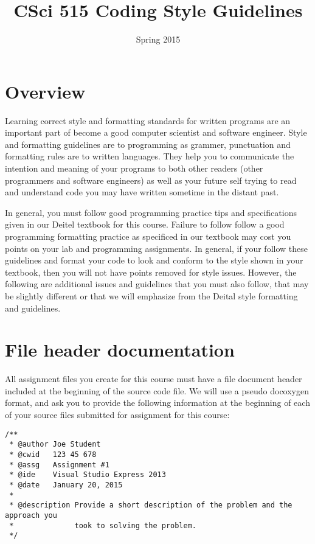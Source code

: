 \documentclass[11pt]{article}
\title{CSci 515 Coding Style Guidelines}
\author{}
\date{Spring 2015}
\begin{document}
\maketitle


\section*{Overview}
\label{sec-1}


Learning correct style and formatting standards for written programs
are an important part of become a good computer scientist and software
engineer.  Style and formatting guidelines are to programming as
grammer, punctuation and formatting rules are to written languages.
They help you to communicate the intention and meaning of your
programs to both other readers (other programmers and software
engineers) as well as your future self trying to read and understand
code you may have written sometime in the distant past.

In general, you must follow good programming practice tips and
specifications given in our Deitel textbook for this course.  Failure
to follow follow a good programming formatting practice as specificed
in our textbook may cost you points on your lab and programming
assignments.  In general, if your follow these guidelines and format
your code to look and conform to the style shown in your textbook,
then you will not have points removed for style issues.  However, the
following are additional issues and guidelines that you must also
follow, that may be slightly different or that we will emphasize from
the Deital style formatting and guidelines.
\section*{File header documentation}
\label{sec-2}


All assignment files you create for this course must have a file
document header included at the beginning of the source code file.  We
will use a pseudo docoxygen format, and ask you to provide the
following information at the beginning of each of your source files
submitted for assignment for this course:


\begin{verbatim}
/** 
 * @author Joe Student
 * @cwid   123 45 678
 * @assg   Assignment #1
 * @ide    Visual Studio Express 2013
 * @date   January 20, 2015
 *
 * @description Provide a short description of the problem and the approach you 
 *              took to solving the problem.
 */
\end{verbatim}
\end{document}
